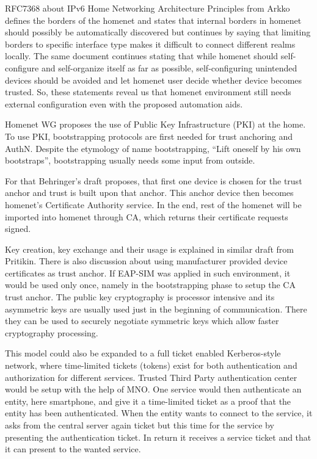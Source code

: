 \documentclass[12pt,a4paper,english]{tutthesis}
\begin{document}
RFC7368 about IPv6 Home Networking Architecture Principles from
Arkko \cite{rfc7368} defines the borders of the homenet and states that
internal borders in homenet should possibly be automatically
discovered but continues by saying that limiting borders to specific
interface type makes it difficult to connect different realms locally.
The same document continues stating
that while homenet should self-configure and self-organize itself as
far as possible, self-configuring unintended devices should be
avoided and let homenet user decide whether device becomes trusted.
So, these statements reveal us that homenet environment still needs
external configuration even with the proposed automation aids.






Homenet WG proposes the use of Public Key Infrastructure (PKI) at the home. To use PKI, bootstrapping
protocols are first needed for trust anchoring and AuthN.  
Despite the etymology  of name bootstrapping, ``Lift oneself by his own bootstraps'', 
bootstrapping usually needs some input from outside. 

For that Behringer's draft \cite{draft-behringer-bootstrap} proposes,
that first one device is chosen for the trust anchor and trust is
built upon that anchor. This anchor device then becomes homenet's
Certificate Authority service. In the end, rest of the homenet will be
imported into homenet through CA, which returns their certificate
requests signed.


Key creation, key exchange and their usage is explained in similar
draft from Pritikin\cite{draft-pritikin-bootstrap}. There is also discussion about using
manufacturer provided device certificates as trust anchor.  If EAP-SIM
was applied in such environment, it would be used only once, namely in
the bootstrapping phase to setup the CA trust anchor.  The public key
cryptography is processor intensive and its asymmetric keys are
usually used just in the beginning of communication. There they can be
used to securely negotiate symmetric keys which allow faster
cryptography processing. 


This model could also be expanded to a full ticket enabled
Kerberos-style network, where time-limited tickets (tokens) exist for
both authentication and authorization for different services. Trusted
Third Party authentication center would be setup with the help of MNO.
One service would then authenticate an entity, here smartphone, and
give it a time-limited ticket as a proof that the entity has been authenticated.
When the entity wants to connect to the service, it asks from the central 
server again ticket but this time for the service by presenting
the authentication ticket. In return it receives a service ticket and that
it can present to the wanted service.
\end{document}

